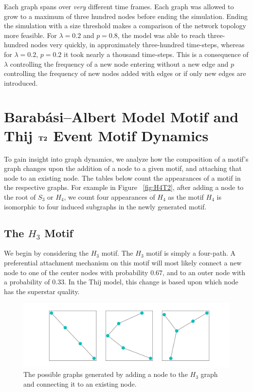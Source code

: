 Each graph spans over \textit{very} different
time frames. Each graph was allowed to grow to a maximum of three hundred nodes before ending the simulation. Ending the simulation with a size
threshold makes a comparison of the network topology more feasible. For $\lambda=0.2$ and $p=0.8$, the model was able to reach 
three-hundred nodes very quickly, in approximately three-hundred time-steps, whereas for $\lambda=0.2$, $p=0.2$ it took nearly a thousand time-steps. 
This is a consequence of $\lambda$ controlling the frequency of a new node entering without a new edge and
$p$ controlling the frequency of new nodes added with edges or if only new edges are introduced. 

\chapter{Barabási–Albert Model Motif and Thij \texorpdfstring{$\bf T2$}{T2} Event Motif Dynamics}

To gain insight into graph dynamics, we analyze how the composition of a motif's graph changes 
upon the addition of a node to a given motif, and attaching that node to an existing node. 
The tables below count the appearances of a motif in the respective graphs.
For example in Figure ~\ref{fig:H4T2}, after adding a node to the root of $S_3$ or $H_{4}$, we count four appearances 
of $H_{4}$ as the motif $H_{4}$ is isomorphic to four induced subgraphs in the newly generated motif. 

\section{The \texorpdfstring{$H_{3}$}{H3} Motif}
We begin by considering the $H_{3}$ motif. The $H_{3}$ motif is simply a four-path. A preferential attachment
mechanism on this motif will most likely connect a new node to one of the center nodes with probability
$0.67$, and to an outer node with a probability of $0.33$. In the Thij model,
this change is based upon which node has the superstar quality. 

\begin{figure}[!ht]
    \includegraphics[width=\linewidth]{Images/H3_evolution.png}
    \centering
    \caption{The possible graphs generated by adding a node to the $H_{3}$ graph 
    and connecting it to an existing node.}
\end{figure}
\FloatBarrier

